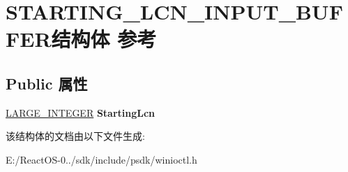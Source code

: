 \hypertarget{struct_s_t_a_r_t_i_n_g___l_c_n___i_n_p_u_t___b_u_f_f_e_r}{}\section{S\+T\+A\+R\+T\+I\+N\+G\+\_\+\+L\+C\+N\+\_\+\+I\+N\+P\+U\+T\+\_\+\+B\+U\+F\+F\+E\+R结构体 参考}
\label{struct_s_t_a_r_t_i_n_g___l_c_n___i_n_p_u_t___b_u_f_f_e_r}
\subsection*{Public 属性}
\begin{DoxyCompactItemize}
\item 
\mbox{\label{struct_s_t_a_r_t_i_n_g___l_c_n___i_n_p_u_t___b_u_f_f_e_r_ac4c93797d092a1cf7751dc4f60fec610}} 
\hyperlink{union___l_a_r_g_e___i_n_t_e_g_e_r}{L\+A\+R\+G\+E\+\_\+\+I\+N\+T\+E\+G\+ER} {\bfseries Starting\+Lcn}
\end{DoxyCompactItemize}


该结构体的文档由以下文件生成\+:\begin{DoxyCompactItemize}
\item 
E\+:/\+React\+O\+S-\/0../sdk/include/psdk/winioctl.\+h\end{DoxyCompactItemize}

